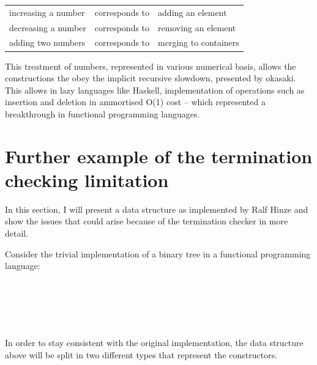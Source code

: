 \documentclass[12pt,twoside,notitlepage]{report}
\begin{document}
\vspace{5mm} %
\begin{tabular}{lcl}
increasing a number & corresponds to & adding an element\\
decreasing a number & corresponds to & removing an element \\
adding two numbers & corresponds to & merging to containers \\
\end{tabular} 
\vspace{5mm}

This treatment of numbers, represented in various numerical basis, allows the constructions the obey the implicit recursive slowdown, presented by okasaki. This allows in lazy languages like Haskell, implementation of operations such as insertion and deletion in ammortised O(1) cost -- which represented a breakthrough in functional programming languages.

\section{Further example of the termination checking limitation}
\label{app:termcheck}
In this section, I will present a data structure as implemented by Ralf Hinze\cite{nestedhinze} and show the issues that could arise because of the termination checker in more detail. 

Consider the trivial implementation of a binary tree in a functional programming language:

\begin{code}
\\
\>[2]\<[4]%
\>[4]  \AgdaSymbol{(} \AgdaSymbol{:} \AgdaSymbol{)} \AgdaSymbol{:}  \<%
\\
\>[4]\<[6]%
\>[6] \AgdaSymbol{:}    \<%
\\
\>[4]\<[6]%
\>[6] \AgdaSymbol{:}        \<%
\\
\end{code}

In order to stay consistent with the original implementation, the data structure above will be split in two different types that represent the constructors.
\end{document}
